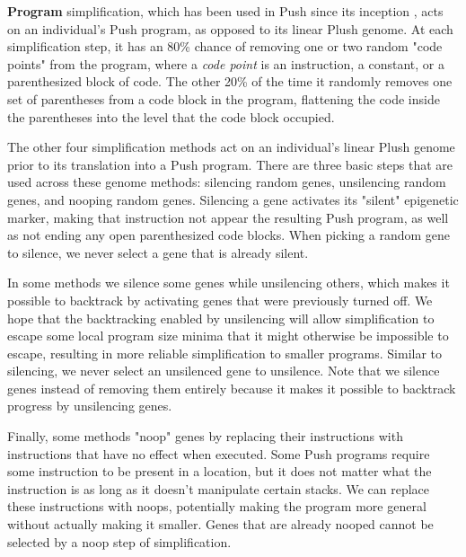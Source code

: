 \textbf{Program} simplification, which has been used in Push since its inception \cite{Robinson:2001:GPtieus}, acts on an individual's Push program, as opposed to its linear Plush genome. At each simplification step, it has an 80\% chance of removing one or two random "code points" from the program, where a \textit{code point} is an instruction, a constant, or a parenthesized block of code. The other 20\% of the time it randomly removes one set of parentheses from a code block in the program, flattening the code inside the parentheses into the level that the code block occupied.

The other four simplification methods act on an individual's linear Plush genome prior to its translation into a Push program. There are three basic steps that are used across these genome methods: silencing random genes, unsilencing random genes, and nooping random genes. Silencing a gene activates its "silent" epigenetic marker, making that instruction not appear the resulting Push program, as well as not ending any open parenthesized code blocks. When picking a random gene to silence, we never select a gene that is already silent.

In some methods we silence some genes while unsilencing others, which makes it possible to backtrack by activating genes that were previously turned off. We hope that the backtracking enabled by unsilencing will allow simplification to escape some local program size minima that it might otherwise be impossible to escape, resulting in more reliable simplification to smaller programs. Similar to silencing, we never select an unsilenced gene to unsilence. Note that we silence genes instead of removing them entirely because it makes it possible to backtrack progress by unsilencing genes.

Finally, some methods "noop" genes by replacing their instructions with instructions that have no effect when executed. Some Push programs require some instruction to be present in a location, but it does not matter what the instruction is as long as it doesn't manipulate certain stacks. We can replace these instructions with noops, potentially making the program more general without actually making it smaller. Genes that are already nooped cannot be selected by a noop step of simplification.

